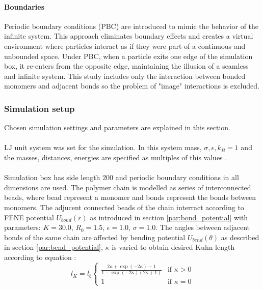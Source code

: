 \documentclass[
    paper=A4,pagesize=automedia,fontsize=12pt,
    BCOR=15mm,DIV=22,
    twoside,headinclude,footinclude=false,
    fleqn,             %
    bibliography=totocnumbered,          %
    listof=totoc,                %
    listof=flat,                 %
    cleardoublepage=empty      %
    numbers=endperiod
]{scrartcl}
\begin{document}
\paragraph{Boundaries}
Periodic boundary conditions (PBC) are introduced to mimic the behavior of the infinite system.
This approach eliminates boundary effects and creates a virtual environment where particles 
interact as if they were part of a continuous and unbounded space.
Under PBC, when a particle exits one edge of the simulation box, it re-enters from the opposite edge, 
maintaining the illusion of a seamless and infinite system. This study includes only the interaction
between bonded monomers and adjacent bonds so the problem of "image" interactions is excluded. 


\subsubsection{Simulation setup}
Chosen simulation settings and parameters are explained in this section.
\\
\\
LJ unit system was set for the simulation. In this system 
mass, $\sigma, \epsilon, k_B = 1$ and the masses, distances, energies are specified
as multiples of this values \cite{LAMMPS}.
\\
\\
Simulation box has side length $200$ and periodic boundary conditions in all 
dimensions are used. The polymer chain is modelled as series of interconnected
beads, where bead represent a monomer and bonds represent the bonds between monomers.
The adjucent connected beads of the chain interract according to FENE potential $U_{bond}(r)$
as introduced in section \ref{par:bond_potential} with parameters: 
$K=30.0$, $R_0=1.5$, $\epsilon=1.0$, $\sigma=1.0$.
The angles between adjacent bonds of the same chain are affected by bending potential
$U_{bend}(\theta)$ as described in section \ref{par:bend_potential}, $\kappa$ is varied to obtain
desired Kuhn length according to equation \cite{svaneborg_2020}:
\begin{equation}
    l_K = l_b 
    \begin{cases}
        \frac{2 \kappa + \exp(-2 \kappa) - 1}{1-\exp(-2\kappa)(2\kappa + 1)} & \text{if } \kappa > 0 \\
        1 & \text{if } \kappa = 0 
    \end{cases}
\end{equation}
\\
\\
\end{document}
